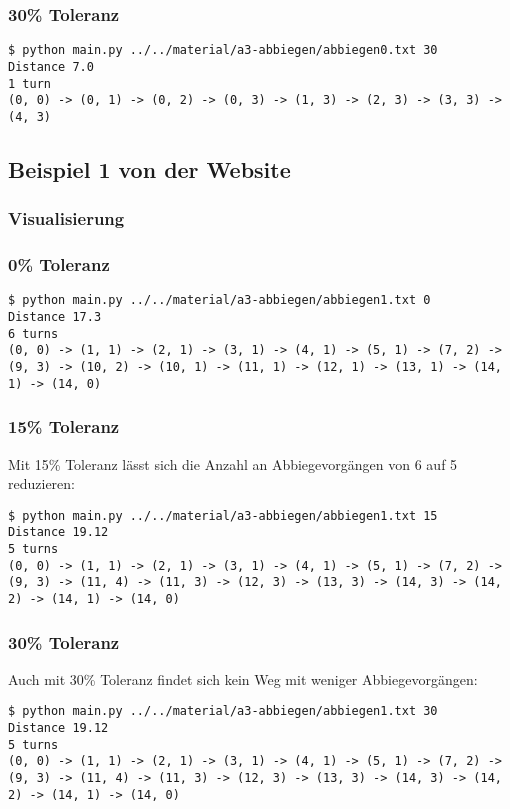 \documentclass[a4paper,10pt,ngerman]{scrartcl}
\begin{document}
\subsubsection{30\% Toleranz}
\begin{lstlisting}
$ python main.py ../../material/a3-abbiegen/abbiegen0.txt 30
Distance 7.0
1 turn
(0, 0) -> (0, 1) -> (0, 2) -> (0, 3) -> (1, 3) -> (2, 3) -> (3, 3) -> (4, 3)
\end{lstlisting}

\subsection{Beispiel 1 von der Website}
\subsubsection{Visualisierung}


\subsubsection{0\% Toleranz}
\begin{lstlisting}
$ python main.py ../../material/a3-abbiegen/abbiegen1.txt 0
Distance 17.3
6 turns
(0, 0) -> (1, 1) -> (2, 1) -> (3, 1) -> (4, 1) -> (5, 1) -> (7, 2) -> (9, 3) -> (10, 2) -> (10, 1) -> (11, 1) -> (12, 1) -> (13, 1) -> (14, 1) -> (14, 0)
\end{lstlisting}

\subsubsection{15\% Toleranz}
Mit 15\% Toleranz lässt sich die Anzahl an Abbiegevorgängen von 6 auf 5 reduzieren:
\begin{lstlisting}
$ python main.py ../../material/a3-abbiegen/abbiegen1.txt 15
Distance 19.12
5 turns
(0, 0) -> (1, 1) -> (2, 1) -> (3, 1) -> (4, 1) -> (5, 1) -> (7, 2) -> (9, 3) -> (11, 4) -> (11, 3) -> (12, 3) -> (13, 3) -> (14, 3) -> (14, 2) -> (14, 1) -> (14, 0)
\end{lstlisting}

\subsubsection{30\% Toleranz}
Auch mit 30\% Toleranz findet sich kein Weg mit weniger Abbiegevorgängen:
\begin{lstlisting}
$ python main.py ../../material/a3-abbiegen/abbiegen1.txt 30
Distance 19.12
5 turns
(0, 0) -> (1, 1) -> (2, 1) -> (3, 1) -> (4, 1) -> (5, 1) -> (7, 2) -> (9, 3) -> (11, 4) -> (11, 3) -> (12, 3) -> (13, 3) -> (14, 3) -> (14, 2) -> (14, 1) -> (14, 0)
\end{lstlisting}
\end{document}
